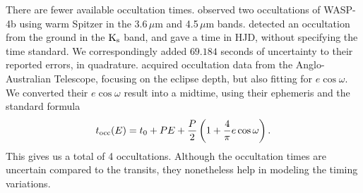 \documentclass[12pt,twocolumn,tighten]{aastex62}
\begin{document}

There are fewer available occultation times.
\citet{beerer_secondary_2011} observed two occultations of WASP-4b
using warm Spitzer in the 3.6\,$\mu$m and 4.5\,$\mu$m bands.
\citet{caceres_ground-based_2011} detected an occultation from the
ground in the ${\rm K}_{\rm s}$ band, and gave a time in HJD, without
specifying the time standard.  We correspondingly added $69.184$
seconds of uncertainty to their reported errors, in quadrature.
\citet{zhou_secondary_2015} acquired occultation data from the
Anglo-Australian Telescope, focusing on the eclipse depth, but also
fitting for $e\cos\omega$.  We converted their $e\cos\omega$ result
into a midtime, using their ephemeris and the standard formula
\citep[{\it e.g.},][]{winn_exoplanet_2010}
\begin{equation}
  t_{\rm occ}(E) =
  t_0 +  P E  +
  \frac{P}{2} \left( 1 + \frac{4}{\pi} e\cos\omega \right).
  \label{eq:occultation_time}
\end{equation}
This gives us a total of 4 occultations.  Although the occultation
times are uncertain compared to the transits, they nonetheless help in
modeling the timing variations.
\end{document}
